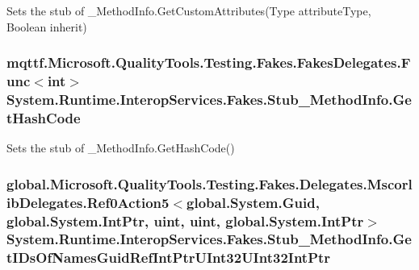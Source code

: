 Sets the stub of \-\_\-\-Method\-Info.\-Get\-Custom\-Attributes(\-Type attribute\-Type, Boolean inherit)

\hypertarget{class_system_1_1_runtime_1_1_interop_services_1_1_fakes_1_1_stub___method_info_afb85d3b58a5ca343535fefddd504c325}{
\subsubsection[{Get\-Hash\-Code}]{\setlength{\rightskip}{0pt plus 5cm}mqttf.\-Microsoft.\-Quality\-Tools.\-Testing.\-Fakes.\-Fakes\-Delegates.\-Func$<$int$>$ System.\-Runtime.\-Interop\-Services.\-Fakes.\-Stub\-\_\-\-Method\-Info.\-Get\-Hash\-Code}}\label{class_system_1_1_runtime_1_1_interop_services_1_1_fakes_1_1_stub___method_info_afb85d3b58a5ca343535fefddd504c325}


Sets the stub of \-\_\-\-Method\-Info.\-Get\-Hash\-Code()

\hypertarget{class_system_1_1_runtime_1_1_interop_services_1_1_fakes_1_1_stub___method_info_ac2049740a25975aadb1381509869386a}{
\subsubsection[{Get\-I\-Ds\-Of\-Names\-Guid\-Ref\-Int\-Ptr\-U\-Int32\-U\-Int32\-Int\-Ptr}]{\setlength{\rightskip}{0pt plus 5cm}global.\-Microsoft.\-Quality\-Tools.\-Testing.\-Fakes.\-Delegates.\-Mscorlib\-Delegates.\-Ref0\-Action5$<$global.\-System.\-Guid, global.\-System.\-Int\-Ptr, uint, uint, global.\-System.\-Int\-Ptr$>$ System.\-Runtime.\-Interop\-Services.\-Fakes.\-Stub\-\_\-\-Method\-Info.\-Get\-I\-Ds\-Of\-Names\-Guid\-Ref\-Int\-Ptr\-U\-Int32\-U\-Int32\-Int\-Ptr}}\label{class_system_1_1_runtime_1_1_interop_services_1_1_fakes_1_1_stub___method_info_ac2049740a25975aadb1381509869386a}


